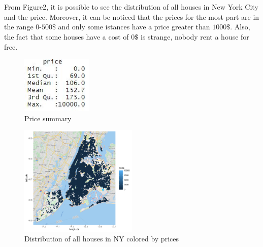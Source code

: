 \documentclass{FR16}
\begin{document}
\\
\\From Figure2, it is possible to see the distribution of all houses in New York City and the price. Moreover, it can be noticed that the prices for the most part are in the range $0$-$500\$$ and only some istances have a price greater than $1000\$$. Also, the fact that some houses have a cost of $0\$$ is strange, nobody rent a house for free.
 \begin{figure}[H]
\centering
\includegraphics[width=0.3\textwidth]{figures/figure1.jpg} 
\caption{\label{fig:1}Price summary}
\end{figure}
\begin{figure}[H]
\centering
\includegraphics[width=0.5\textwidth]{figures/figure2.pdf} 
\caption{\label{fig:2}Distribution of all houses in NY colored by prices}
\end{figure}
\end{document}
